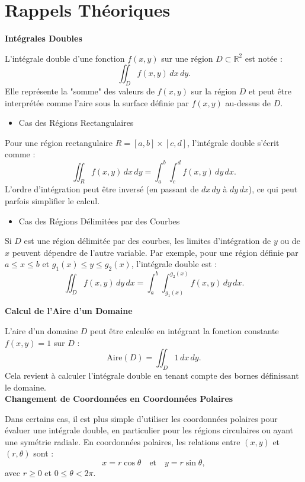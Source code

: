 
\section*{Rappels Théoriques}

\textbf{Intégrales Doubles}

L'intégrale double d'une fonction \( f(x, y) \) sur une région \( D \subset \mathbb{R}^2 \) est notée :
\[
\iint_D f(x, y) \, dx \, dy.
\]
Elle représente la "somme" des valeurs de \( f(x, y) \) sur la région \( D \) et peut être interprétée comme l'aire sous la surface définie par \( f(x, y) \) au-dessus de \( D \). \\

\begin{itemize}
    \item Cas des Régions Rectangulaires
\end{itemize}

Pour une région rectangulaire \( R = [a, b] \times [c, d] \), l'intégrale double s'écrit comme :
\[
\iint_R f(x, y) \, dx \, dy = \int_a^b \int_c^d f(x, y) \, dy \, dx.
\]
L'ordre d'intégration peut être inversé (en passant de \( dx \, dy \) à \( dy \, dx \)), ce qui peut parfois simplifier le calcul. \\

\begin{itemize}
    \item Cas des Régions Délimitées par des Courbes
\end{itemize}

Si \( D \) est une région délimitée par des courbes, les limites d'intégration de \( y \) ou de \( x \) peuvent dépendre de l'autre variable. Par exemple, pour une région définie par \( a \leq x \leq b \) et \( g_1(x) \leq y \leq g_2(x) \), l'intégrale double est :
\[
\iint_D f(x, y) \, dy \, dx = \int_a^b \int_{g_1(x)}^{g_2(x)} f(x, y) \, dy \, dx.
\] 

\textbf{Calcul de l'Aire d'un Domaine}

L'aire d'un domaine \( D \) peut être calculée en intégrant la fonction constante \( f(x, y) = 1 \) sur \( D \) :
\[
\text{Aire}(D) = \iint_D 1 \, dx \, dy.
\]
Cela revient à calculer l'intégrale double en tenant compte des bornes définissant le domaine. \\

\textbf{Changement de Coordonnées en Coordonnées Polaires}

Dans certains cas, il est plus simple d’utiliser les coordonnées polaires pour évaluer une intégrale double, en particulier pour les régions circulaires ou ayant une symétrie radiale. En coordonnées polaires, les relations entre \( (x, y) \) et \( (r, \theta) \) sont :
\[
x = r \cos \theta \quad \text{et} \quad y = r \sin \theta,
\]
avec \( r \geq 0 \) et \( 0 \leq \theta < 2\pi \).

